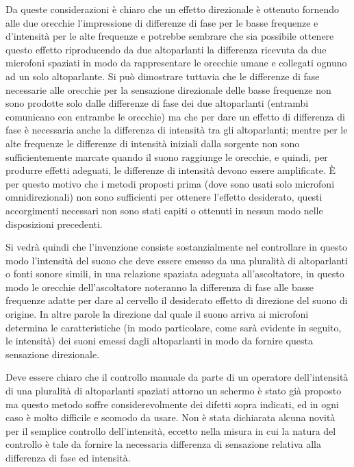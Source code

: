 \documentclass[11pt]{article}
\begin{document}
\begin{multicols*}{2}
Da queste considerazioni è chiaro che un effetto direzionale è ottenuto fornendo alle due orecchie l’impressione di differenze di fase per le basse frequenze e d’intensità per le alte frequenze e potrebbe sembrare che sia possibile ottenere questo effetto riproducendo da due altoparlanti la differenza ricevuta da due microfoni spaziati in modo da rappresentare le orecchie umane e collegati ognuno ad un solo altoparlante. Si può dimostrare tuttavia che le differenze di fase necessarie alle orecchie per la sensazione direzionale delle basse frequenze non sono prodotte solo dalle differenze di fase dei due altoparlanti (entrambi comunicano con entrambe le orecchie) ma che per dare un effetto di differenza di fase è necessaria anche la differenza di intensità tra gli altoparlanti; mentre per le alte frequenze le differenze di intensità iniziali dalla sorgente non sono sufficientemente marcate quando il suono raggiunge le orecchie, e quindi, per produrre effetti adeguati, le differenze di intensità devono essere amplificate. È per questo motivo che i metodi proposti prima (dove sono usati solo microfoni omnidirezionali) non sono sufficienti per ottenere l’effetto desiderato, questi accorgimenti necessari non sono stati capiti o ottenuti in nessun modo nelle disposizioni precedenti. 

Si vedrà quindi che l’invenzione consiste sostanzialmente nel controllare in questo modo l’intensità del suono che deve essere emesso da una pluralità di altoparlanti o fonti sonore simili, in una relazione spaziata adeguata all’ascoltatore, in questo modo le orecchie dell’ascoltatore noteranno la differenza di fase alle basse frequenze adatte per dare al cervello il desiderato effetto di direzione del suono di origine. In altre parole la direzione dal quale il suono arriva ai microfoni determina le caratteristiche (in modo particolare, come sarà evidente in seguito, le intensità) dei suoni emessi dagli altoparlanti in modo da fornire questa sensazione direzionale.

Deve essere chiaro che il controllo manuale da parte di un operatore dell’intensità di una pluralità di altoparlanti spaziati attorno un schermo è stato già proposto ma questo metodo soffre considerevolmente dei difetti sopra indicati, ed in ogni caso è molto difficile e scomodo da usare. Non è stata dichiarata alcuna novità per il semplice controllo dell’intensità, eccetto nella misura in cui la natura del controllo è tale da fornire la necessaria differenza di sensazione relativa alla differenza di fase ed intensità.


\end{multicols*}
\end{document}

